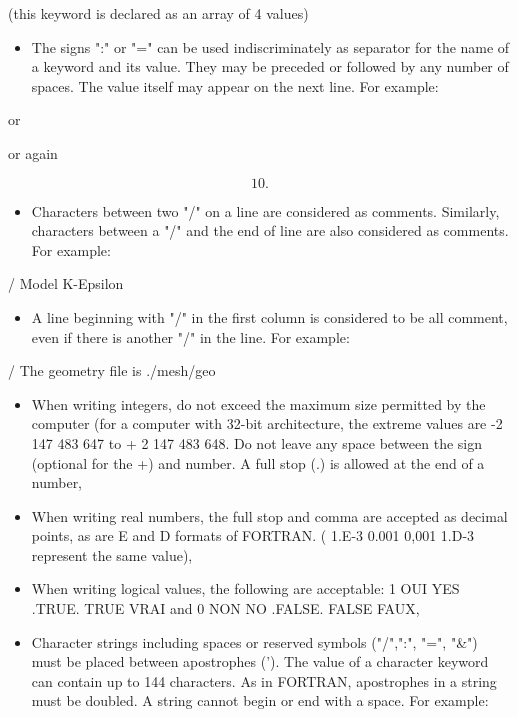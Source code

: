 
 (this keyword is declared as an array of 4 values)

\begin{itemize}
\item The signs ":" or "=" can be used indiscriminately as separator
for the name of a keyword and its value.
They may be preceded or followed by any number of spaces.
The value itself may appear on the next line. For example:
\end{itemize}


or


or again

\[10.\]

\begin{itemize}
\item Characters between two "/" on a line are considered as comments.
Similarly, characters between a "/" and the end of line are also considered as
comments.
For example:
\end{itemize}

      / Model K-Epsilon

\begin{itemize}
\item A line beginning with "/" in the first column is considered to be all
comment, even if there is another "/" in the line. For example:
\end{itemize}

 / The geometry file is ./mesh/geo

\begin{itemize}
\item When writing integers, do not exceed the maximum size permitted by the
computer (for a computer with 32-bit architecture, the extreme values are
-2 147 483 647 to + 2 147 483 648.
Do not leave any space between the sign (optional for the +) and number.
A full stop (.) is allowed at the end of a number,

\item When writing real numbers, the full stop and comma are accepted
as decimal points, as are E and D formats of FORTRAN.
( 1.E-3  0.001  0,001  1.D-3 represent the same value),

\item When writing logical values, the following are acceptable:
1 OUI  YES  .TRUE.  TRUE  VRAI and 0 NON  NO  .FALSE.  FALSE  FAUX,

\item Character strings including spaces or reserved symbols
("/",":", "=", "\&") must be placed between apostrophes (').
The value of a character keyword can contain up to 144 characters.
As in FORTRAN, apostrophes in a string must be doubled.
A string cannot begin or end with a space. For example:
\end{itemize}

